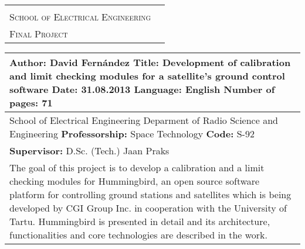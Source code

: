\thispagestyle{empty}
\begin{tabular}{l r}
\begin{minipage}[c]{102mm} 
\textsc{Aalto University}\\ \textsc{School of Electrical Engineering}
\end{minipage}
 & \hfill
\begin{minipage}[c]{40mm} 
\begin{flushright}
\textsc{Abstract of the}\\ \textsc{Final Project}
\end{flushright}
\end{minipage}\\ 
\end{tabular}

\begin{tabular}{|l|}
\hline %
\begin{minipage}[c][26mm]{\textwidth} 
\vfill
\textbf{Author:} David Fernández \vfill
\textbf{Title:} Development of calibration and limit checking modules for a satellite's ground control software \vfill
\textbf{Date:} 31.08.2013 \hfill \textbf{Language:} English \hfill \textbf{Number of pages:} 71 \vfill
\vfill
\end{minipage}\\ 
\hline

\begin{minipage}[c][18mm]{\textwidth} 
\vfill
School of Electrical Engineering \vfill
Deparment of Radio Science and Engineering \vfill
\textbf{Professorship:} Space Technology \hfill \textbf{Code:} S-92\vfill
\vfill
\end{minipage}\\
\hline

\begin{minipage}[c][12mm]{\textwidth} 
\vfill
\textbf{Supervisor:} D.Sc. (Tech.) Jaan Praks \vfill
\vfill
\end{minipage}\\
\hline
\begin{minipage}[t][133mm]{\textwidth} %
The goal of this project is to develop a calibration and a limit checking modules for Hummingbird, an open source software platform for controlling ground stations and satellites which is being developed by CGI Group Inc. in cooperation with the University of Tartu. Hummingbird is presented in detail and its architecture, functionalities and core technologies are described in the work.

 



\end{minipage}
\end{tabular}
